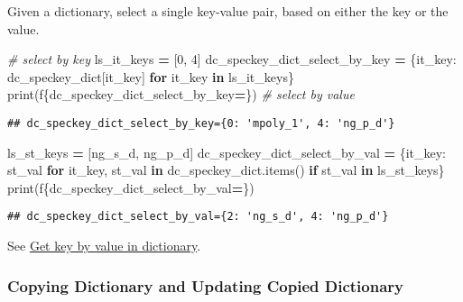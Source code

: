 \documentclass[
]{book}
\newenvironment{Shaded}{\begin{snugshade}}{\end{snugshade}}
\newcommand{\BuiltInTok}[1]{#1}
\newcommand{\CommentTok}[1]{\textcolor[rgb]{0.56,0.35,0.01}{\textit{#1}}}
\newcommand{\ControlFlowTok}[1]{\textcolor[rgb]{0.13,0.29,0.53}{\textbf{#1}}}
\newcommand{\DecValTok}[1]{\textcolor[rgb]{0.00,0.00,0.81}{#1}}
\newcommand{\KeywordTok}[1]{\textcolor[rgb]{0.13,0.29,0.53}{\textbf{#1}}}
\newcommand{\NormalTok}[1]{#1}
\newcommand{\OperatorTok}[1]{\textcolor[rgb]{0.81,0.36,0.00}{\textbf{#1}}}
\newcommand{\SpecialCharTok}[1]{\textcolor[rgb]{0.00,0.00,0.00}{#1}}
\newcommand{\SpecialStringTok}[1]{\textcolor[rgb]{0.31,0.60,0.02}{#1}}
\newcommand{\StringTok}[1]{\textcolor[rgb]{0.31,0.60,0.02}{#1}}
\begin{document}
Given a dictionary, select a single key-value pair, based on either the key or the value.

\begin{Shaded}
\begin{Highlighting}[]
\CommentTok{\# select by key}
\NormalTok{ls\_it\_keys }\OperatorTok{=}\NormalTok{ [}\DecValTok{0}\NormalTok{, }\DecValTok{4}\NormalTok{]}
\NormalTok{dc\_speckey\_dict\_select\_by\_key }\OperatorTok{=}\NormalTok{ \{it\_key: dc\_speckey\_dict[it\_key] }\ControlFlowTok{for}\NormalTok{ it\_key }\KeywordTok{in}\NormalTok{ ls\_it\_keys\}}
\BuiltInTok{print}\NormalTok{(}\SpecialStringTok{f\textquotesingle{}}\SpecialCharTok{\{}\NormalTok{dc\_speckey\_dict\_select\_by\_key}\OperatorTok{=}\SpecialCharTok{\}}\SpecialStringTok{\textquotesingle{}}\NormalTok{)}
\CommentTok{\# select by value}
\end{Highlighting}
\end{Shaded}

\begin{verbatim}
## dc_speckey_dict_select_by_key={0: 'mpoly_1', 4: 'ng_p_d'}
\end{verbatim}

\begin{Shaded}
\begin{Highlighting}[]
\NormalTok{ls\_st\_keys }\OperatorTok{=}\NormalTok{ [}\StringTok{\textquotesingle{}ng\_s\_d\textquotesingle{}}\NormalTok{, }\StringTok{\textquotesingle{}ng\_p\_d\textquotesingle{}}\NormalTok{]}
\NormalTok{dc\_speckey\_dict\_select\_by\_val }\OperatorTok{=}\NormalTok{ \{it\_key: st\_val }\ControlFlowTok{for}\NormalTok{ it\_key, st\_val }\KeywordTok{in}\NormalTok{ dc\_speckey\_dict.items() }
                                 \ControlFlowTok{if}\NormalTok{ st\_val }\KeywordTok{in}\NormalTok{ ls\_st\_keys\}}
\BuiltInTok{print}\NormalTok{(}\SpecialStringTok{f\textquotesingle{}}\SpecialCharTok{\{}\NormalTok{dc\_speckey\_dict\_select\_by\_val}\OperatorTok{=}\SpecialCharTok{\}}\SpecialStringTok{\textquotesingle{}}\NormalTok{)}
\end{Highlighting}
\end{Shaded}

\begin{verbatim}
## dc_speckey_dict_select_by_val={2: 'ng_s_d', 4: 'ng_p_d'}
\end{verbatim}

See \href{https://stackoverflow.com/questions/8023306/get-key-by-value-in-dictionary}{Get key by value in dictionary}.

\hypertarget{copying-dictionary-and-updating-copied-dictionary}{%
\subsubsection{Copying Dictionary and Updating Copied Dictionary}\label{copying-dictionary-and-updating-copied-dictionary}}
\end{document}
